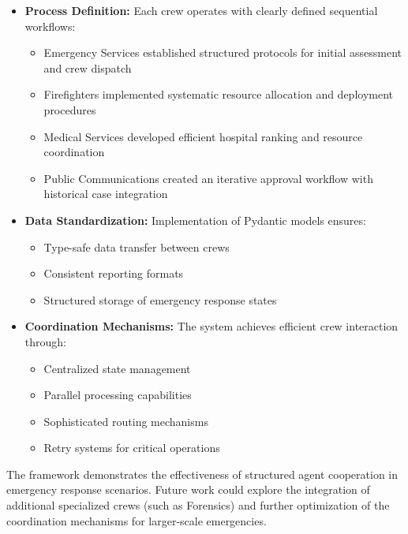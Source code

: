 \documentclass[12pt,a4paper]{article}
\begin{document}
\begin{itemize}
    \item \textbf{Process Definition:} Each crew operates with clearly defined sequential workflows:
    \begin{itemize}
        \item Emergency Services established structured protocols for initial assessment and crew dispatch
        \item Firefighters implemented systematic resource allocation and deployment procedures
        \item Medical Services developed efficient hospital ranking and resource coordination
        \item Public Communications created an iterative approval workflow with historical case integration
    \end{itemize}
    
    \item \textbf{Data Standardization:} Implementation of Pydantic models ensures:
    \begin{itemize}
        \item Type-safe data transfer between crews
        \item Consistent reporting formats
        \item Structured storage of emergency response states
    \end{itemize}
    
    \item \textbf{Coordination Mechanisms:} The system achieves efficient crew interaction through:
    \begin{itemize}
        \item Centralized state management
        \item Parallel processing capabilities
        \item Sophisticated routing mechanisms
        \item Retry systems for critical operations
    \end{itemize}
\end{itemize}

The framework demonstrates the effectiveness of structured agent cooperation in emergency response scenarios. Future work could explore the integration of additional specialized crews (such as Forensics) and further optimization of the coordination mechanisms for larger-scale emergencies.
\end{document}
